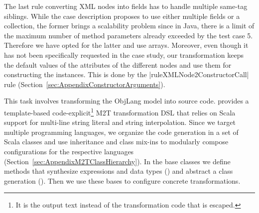The last rule converting XML nodes into fields has to handle multiple same-tag siblings.
While the case description proposes to use either multiple fields or a collection, the former brings a scalability problem since in Java, there is a limit of the maximum number of method parameters already exceeded by the test case 5.
Therefore we have opted for the latter and use arrays.
Moreover, even though it has not been specifically requested in the case study, our transformation keeps the default values of the attributes of the different nodes and use them for constructing the instances.
This is done by the \Scala|ruleXMLNode2ConstructorCall| rule (\Cf Section~\ref{sec:AppendixConstructorArguments}).


\enlargethispage{20mm}

This task involves transforming the ObjLang model into source code.
\SIGMA provides a template-based code-explicit\footnote{It is the output text instead of the transformation code that is escaped.} M2T transformation DSL that relies on Scala support for multi-line string literal and string interpolation.
%
Since we target multiple programming languages, we organize the code generation in a set of Scala classes and use inheritance and class mix-ins to modularly compose configurations for the respective languages (\Cf Section~\ref{sec:AppendixM2TClassHierarchy}).
In the base classes we define methods that synthesize expressions and data types (\href{https://github.com/fikovnik/ttc14-fixml-sigma/blob/master/ttc14-fixml-base/src/fr/inria/spirals/sigma/ttc14/fixml/BaseObjLangMTT.scala}{}) and abstract a class generation (\href{https://github.com/fikovnik/ttc14-fixml-sigma/blob/master/ttc14-fixml-base/src/fr/inria/spirals/sigma/ttc14/fixml/BaseObjLang2Class.scala}{}).
Then we use these bases to configure concrete transformations.

